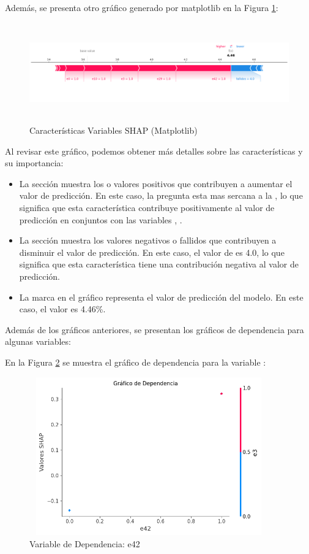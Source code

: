 Además, se presenta otro gráfico generado por matplotlib en la Figura \ref{fig:caract_var_shap_mat_lr2}:

\begin{figure}[H]
    \centering
    \includegraphics[width=6.0611in,height=1.6861in]{img/shap_lr/shapForcePlot_lr2.png}
    \caption{Características Variables SHAP (Matplotlib)}
    \label{fig:caract_var_shap_mat_lr2}
\end{figure}

Al revisar este gráfico, podemos obtener más detalles sobre las características y su importancia:

\begin{itemize}
    \item La sección  muestra los  o valores positivos que contribuyen a aumentar el valor de predicción. En este caso, la pregunta  esta mas sercana a la , lo que significa que esta característica contribuye positivamente al valor de predicción en conjuntos con las variables , .
    \item La sección  muestra los valores negativos o fallidos que contribuyen a disminuir el valor de predicción. En este caso, el valor de  es 4.0, lo que significa que esta característica tiene una contribución negativa al valor de predicción.
    \item La marca  en el gráfico representa el valor de predicción del modelo. En este caso, el valor es 4.46\%.
\end{itemize}

Además de los gráficos anteriores, se presentan los gráficos de dependencia para algunas variables:

En la Figura \ref{fig:dependencia_e42_lr} se muestra el gráfico de dependencia para la variable :

\begin{figure}[H]
    \centering
    \includegraphics[width=4.0611in,height=2.6861in]{img/shap_lr/e42.png}
    \caption{Variable de Dependencia: e42}
    \label{fig:dependencia_e42_lr}
\end{figure}

